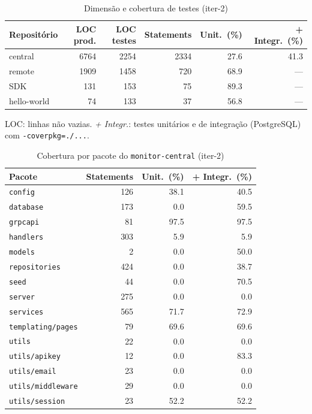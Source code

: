 \begin{table}[htbp]
  \centering\small
  \caption{Dimensão e cobertura de testes (iter-2)}
  \label{tab:iter-2-cobertura}
  \begin{tabular}{lrrrrr}
    \toprule
    Repositório & LOC prod. & LOC testes & Statements & Unit.\ (\%) & + Integr.\ (\%) \\
    \midrule
    central & 6764 & 2254 & 2334 & 27.6 & 41.3 \\
    remote & 1909 & 1458 & 720 & 68.9 & --- \\
    SDK & 131 & 153 & 75 & 89.3 & --- \\
    hello-world & 74 & 133 & 37 & 56.8 & --- \\
    \bottomrule
  \end{tabular}
  \par\smallskip\footnotesize LOC: linhas não vazias. \emph{+ Integr.}: testes unitários e de integração (PostgreSQL) com \texttt{-coverpkg=./...}.
\end{table}

\begin{table}[htbp]
  \centering\small
  \caption{Cobertura por pacote do \texttt{monitor-central} (iter-2)}
  \label{tab:iter-2-cobertura-central}
  \begin{tabular}{lrrr}
    \toprule
    Pacote & Statements & Unit.\ (\%) & + Integr.\ (\%) \\
    \midrule
    \texttt{config} & 126 & 38.1 & 40.5 \\
    \texttt{database} & 173 & 0.0 & 59.5 \\
    \texttt{grpcapi} & 81 & 97.5 & 97.5 \\
    \texttt{handlers} & 303 & 5.9 & 5.9 \\
    \texttt{models} & 2 & 0.0 & 50.0 \\
    \texttt{repositories} & 424 & 0.0 & 38.7 \\
    \texttt{seed} & 44 & 0.0 & 70.5 \\
    \texttt{server} & 275 & 0.0 & 0.0 \\
    \texttt{services} & 565 & 71.7 & 72.9 \\
    \texttt{templating/pages} & 79 & 69.6 & 69.6 \\
    \texttt{utils} & 22 & 0.0 & 0.0 \\
    \texttt{utils/apikey} & 12 & 0.0 & 83.3 \\
    \texttt{utils/email} & 23 & 0.0 & 0.0 \\
    \texttt{utils/middleware} & 29 & 0.0 & 0.0 \\
    \texttt{utils/session} & 23 & 52.2 & 52.2 \\
    \bottomrule
  \end{tabular}
\end{table}
